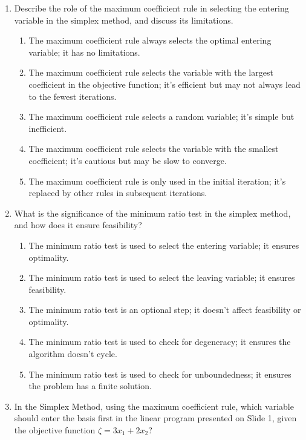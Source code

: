 \documentclass{article}%
\begin{document}
\begin{enumerate}
\begin{enumerate}
\end{enumerate}%
\vspace{1em}%
\item Describe the role of the maximum coefficient rule in selecting the entering variable in the simplex method, and discuss its limitations.%
\begin{enumerate}%
\item The maximum coefficient rule always selects the optimal entering variable; it has no limitations.%
\item The maximum coefficient rule selects the variable with the largest coefficient in the objective function; it's efficient but may not always lead to the fewest iterations.%
\item The maximum coefficient rule selects a random variable; it's simple but inefficient.%
\item The maximum coefficient rule selects the variable with the smallest coefficient; it's cautious but may be slow to converge.%
\item The maximum coefficient rule is only used in the initial iteration; it's replaced by other rules in subsequent iterations.%
\end{enumerate}%
\vspace{1em}%
\item What is the significance of the minimum ratio test in the simplex method, and how does it ensure feasibility?%
\begin{enumerate}%
\item The minimum ratio test is used to select the entering variable; it ensures optimality.%
\item The minimum ratio test is used to select the leaving variable; it ensures feasibility.%
\item The minimum ratio test is an optional step; it doesn't affect feasibility or optimality.%
\item The minimum ratio test is used to check for degeneracy; it ensures the algorithm doesn't cycle.%
\item The minimum ratio test is used to check for unboundedness; it ensures the problem has a finite solution.%
\end{enumerate}%
\vspace{1em}%
\item In the Simplex Method, using the maximum coefficient rule, which variable should enter the basis first in the linear program presented on Slide 1, given the objective function $\zeta = 3x_1 + 2x_2$?%
\begin{enumerate}%

\end{enumerate}
\end{enumerate}
\end{document}

